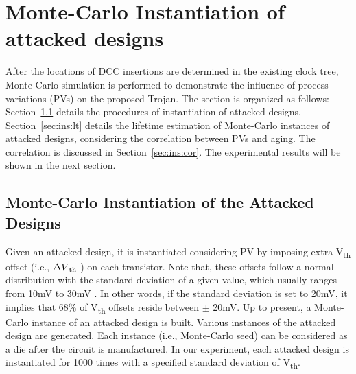 \section{Monte-Carlo Instantiation of attacked designs}
\label{sec:ins}
After the locations of DCC insertions are determined in the existing clock tree, Monte-Carlo simulation is performed to demonstrate the influence of process variations (PVs) on the proposed Trojan. The section is organized as follows: Section~\ref{sec:ins:mc_ins} details the procedures of instantiation of attacked designs. Section~\ref{sec:ins:lt} details the lifetime estimation of Monte-Carlo instances of attacked designs, considering the correlation between PVs and aging. The correlation is discussed in Section~\ref{sec:ins:cor}. The experimental results will be shown in the next section.

\subsection{Monte-Carlo Instantiation of the Attacked Designs}
\label{sec:ins:mc_ins}
Given an attacked design, it is instantiated considering PV by imposing extra V\textsubscript{th} offset (i.e., $\Delta V\textsubscript{th}$ ) on each transistor. Note that, these offsets follow a normal distribution with the standard deviation of a given value, which usually ranges from 10mV to 30mV \cite{han2011statistical}\cite{schlunder2017influence}. In other words, if the standard deviation is set to 20mV, it implies that 68\% of V\textsubscript{th} offsets reside between $\pm$ 20mV. Up to present, a Monte-Carlo instance of an attacked design is built.
Various instances of the attacked design are generated. Each instance (i.e., Monte-Carlo seed) can be considered as a die after the circuit is manufactured. In our experiment, each attacked design is instantiated for 1000 times with a specified standard deviation of V\textsubscript{th}. %

